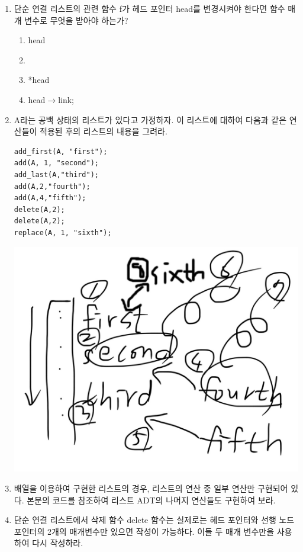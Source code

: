 \documentclass[11pt,a4paper]{article}
\begin{document}
\begin{enumerate}
\item 단순 연결 리스트의 관련 함수 f가 헤드 포인터 head를 변경시켜야 한다면 함수 매개 변수로 무엇을 받아야 하는가?
	\begin{enumerate}
		\item head
		\item {}
		\item *head
		\item head$\rightarrow$link;
	\end{enumerate}
\lstset{language=C, tabsize=4, frame=single, showstringspaces=false, breaklines=true, columns=flexible, basicstyle=\ttfamily\small}


\item A라는 공백 상태의 리스트가 있다고 가정하자. 이 리스트에 대하여 다음과 같은 연산들이 적용된 후의 리스트의 내용을 그려라.
\begin{lstlisting}[frame=none]
add_first(A, "first");
add(A, 1, "second");
add_last(A,"third");
add(A,2,"fourth");
add(A,4,"fifth");
delete(A,2);
delete(A,2);
replace(A, 1, "sixth");
\end{lstlisting}
\includegraphics[width=\textwidth]{11.jpg}


\item 배열을 이용하여 구현한 리스트의 경우, 리스트의 연산 중 일부 연산만 구현되어 있다. 본문의 코드를 참조하여 리스트 ADT의 나머지 연산들도 구현하여 보라.

\item 단순 연결 리스트에서 삭제 함수 delete 함수는 실제로는 헤드 포인터와 선행 노드 포인터의 2개의 매개변수만 있으면 작성이 가능하다. 이들 두 매개 변수만을 사용하여 다시 작성하라.



\end{enumerate}
\end{document}
